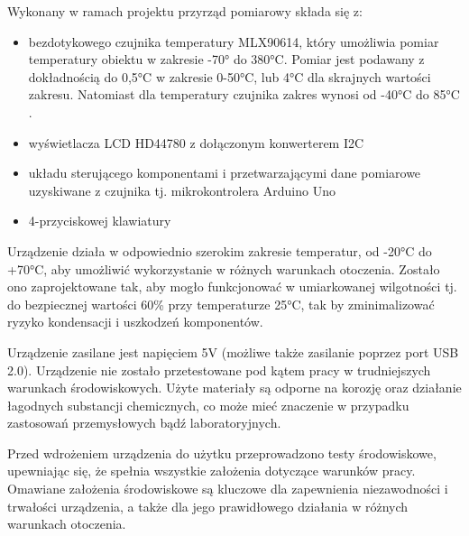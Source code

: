     \vspace{12pt}

    Wykonany w ramach projektu przyrząd pomiarowy składa się z:

    \begin{itemize}

        \item bezdotykowego czujnika temperatury MLX90614, który umożliwia pomiar temperatury obiektu w zakresie -70° do 380°C. Pomiar jest podawany z dokładnością do 0,5°C w zakresie 0-50°C, lub 4°C dla skrajnych wartości zakresu. Natomiast dla temperatury czujnika zakres wynosi od -40°C do 85°C \cite{3}.
        \vspace{12pt}
        \item wyświetlacza LCD HD44780 z dołączonym konwerterem I2C
        \vspace{12pt}
        \item układu sterującego komponentami i przetwarzającymi dane pomiarowe uzyskiwane z czujnika tj. mikrokontrolera Arduino Uno
        \vspace{12pt}
        \item 4-przyciskowej klawiatury 

    \end{itemize}

    
Urządzenie działa w odpowiednio szerokim zakresie temperatur, od -20°C do +70°C, aby umożliwić wykorzystanie w różnych warunkach otoczenia. Zostało ono zaprojektowane tak, aby mogło funkcjonować w umiarkowanej wilgotności tj. do bezpiecznej wartości 60\% przy temperaturze 25°C, tak by zminimalizować ryzyko kondensacji i uszkodzeń komponentów. 

\vspace{12pt}

Urządzenie zasilane jest napięciem 5V (możliwe także zasilanie poprzez port USB 2.0). Urządzenie nie zostało przetestowane pod kątem pracy w trudniejszych warunkach środowiskowych. Użyte materiały są odporne na korozję oraz działanie łagodnych substancji chemicznych, co może mieć znaczenie w przypadku zastosowań przemysłowych bądź laboratoryjnych. 

\vspace{12pt}

Przed wdrożeniem urządzenia do użytku przeprowadzono testy środowiskowe, upewniając się, że spełnia wszystkie założenia dotyczące warunków pracy. Omawiane założenia środowiskowe są kluczowe dla zapewnienia niezawodności i trwałości urządzenia, a także dla jego prawidłowego działania w różnych warunkach otoczenia.

